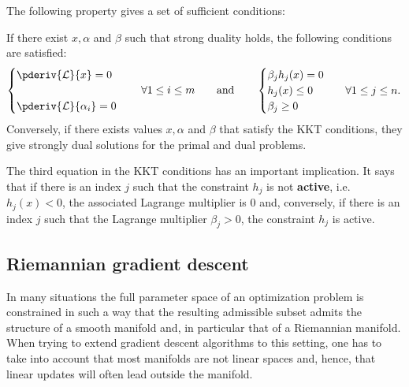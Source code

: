     The following property gives a set of sufficient conditions:
    \begin{property}
        If there exist $x,\alpha$ and $\beta$ such that strong duality holds, the following conditions are satisfied:
        \begin{align}
            \begin{cases}
                \pderiv{\mathcal{L}}{x} = 0\\\\
                \pderiv{\mathcal{L}}{\alpha_i} = 0
            \end{cases}
            \quad\forall1\leq i\leq m \qquad\text{and}\qquad
            \begin{cases}
                \beta_jh_j(x) = 0\\
                h_j(x)\leq0&\quad\forall1\leq j\leq n.\\
                \beta_j\geq0
            \end{cases}
        \end{align}
        Conversely, if there exists values $x,\alpha$ and $\beta$ that satisfy the KKT conditions, they give strongly dual solutions for the primal and dual problems.
    \end{property}
    \begin{remark}\label{data:slackness}
        The third equation in the KKT conditions has an important implication. It says that if there is an index $j$ such that the constraint $h_j$ is not \textbf{active}, i.e.~$h_j(x)<0$, the associated Lagrange multiplier is 0 and, conversely, if there is an index $j$ such that the Lagrange multiplier $\beta_j>0$, the constraint $h_j$ is active.
    \end{remark}


\subsection{Riemannian gradient descent}

    In many situations the full parameter space of an optimization problem is constrained in such a way that the resulting admissible subset admits the structure of a smooth manifold and, in particular that of a Riemannian manifold. When trying to extend gradient descent algorithms to this setting, one has to take into account that most manifolds are not linear spaces and, hence, that linear updates will often lead outside the manifold.


